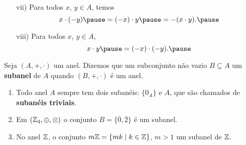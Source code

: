 \documentclass{beamer}
\begin{document}
    \begin{frame}
        \begin{proposicao}
            \begin{enumerate}
                \item[vii)] Para todos $x$, \pause $y \in A$, \pause temos\pause
                \[
                    x \cdot (-y) \pause = (-x) \cdot y \pause = -(x \cdot y).\pause
                \]

                \vspace{.5cm}

                \item[viii)] Para todos $x$, \pause $y \in A$, \pause
                \[
                    x \cdot y \pause = (-x) \cdot (-y).\pause
                \]

                \vspace{.5cm}
            \end{enumerate}
        \end{proposicao}
    \end{frame}

    \begin{frame}
        \begin{definicao}
            Seja $(A, +, \cdot)$ um anel. \pause Dizemos que um subconjunto n{\~a}o vazio \pause $B\subseteq A$  um \textbf{subanel} de $A$ \pause quando $(B, +, \cdot)$ \'e um anel.\pause
        \end{definicao}

        \begin{exemplos}
            \begin{enumerate}[label={\arabic*})]
                \item Todo anel $A$ sempre tem dois suban{\'e}is: \pause $\{0_{A}\}$ \pause e $A$, \pause que s{\~a}o chamados de \textbf{suban{\'e}is triviais}.\pause

                \vspace{.5cm}

                \item Em $(\mathbb{Z}_4,\oplus,\otimes)$ \pause o conjunto $B = \{\overline{0}, \overline{2}\}$ \'e um subanel.\pause

                \vspace{.5cm}

                \item No anel $\mathbb{Z}$, \pause o conjunto $m\mathbb{Z} = \{mk \mid k \in \mathbb{Z}\}$, $m > 1$  um subanel de $\mathbb{Z}$.\pause

                \vspace{.5cm}
            \end{enumerate}
        \end{exemplos}
    \end{frame}
\end{document}

